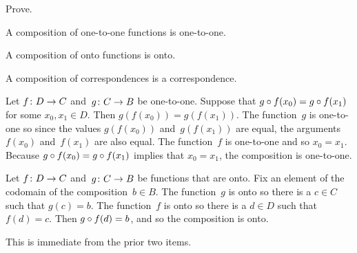 \documentclass{ibl}
\begin{document}
\begin{ex} Prove.
\begin{exes}
\item A composition of one-to-one functions is one-to-one.
\item A composition of onto functions is onto.
\item A composition of correspondences is a correspondence.    
\end{exes}
\begin{ans}
\begin{exes}
\item Let $\mbox{$f\colon D\to C$}$ and~$\mbox{$g\colon C\to B$}$ be one-to-one.
  Suppose that $g\mathbin{\circ} f(x_0)=g\mathbin{\circ} f(x_1)$ for
  some $x_0,x_1\in D$.
  Then $g(f(x_0))=g(f(x_1))$.
  The function~$g$ is one-to-one so since the values $g(f(x_0))$ 
  and~$g(f(x_1))$ are equal, the arguments $f(x_0)$ and~$f(x_1)$ are
  also equal.
  The function~$f$ is one-to-one and so $x_0=x_1$.
  Because $g\mathbin{\circ} f(x_0)=g\mathbin{\circ} f(x_1)$ implies that
  $x_0=x_1$, the composition is one-to-one.
\item Let $\mbox{$f\colon D\to C$}$ and~$\mbox{$g\colon C\to B$}$ be functions that are onto.
  Fix an element of the codomain of the composition~$b\in B$.
  The function~$g$ is onto so there is a $c\in C$ such that $g(c)=b$.
  The function~$f$ is onto so there is a $d\in D$ such that $f(d)=c$.
  Then $g\mathbin{\circ} f(d)=b$, and so the composition is onto.
\item This is immediate from the prior two items. 
\end{exes}
\end{ans}
\end{ex}
\end{document}
